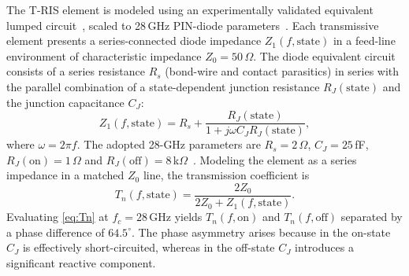 \documentclass[journal]{IEEEtran}
\newcommand{\Tris}{T-RIS}
\begin{document}
The \Tris{} element is modeled using an experimentally validated equivalent
lumped circuit~\cite{demmer2023hybrid}, scaled to 28\,GHz PIN-diode
parameters~\cite{dai2020reconfigurable}. Each transmissive element presents
a series-connected diode impedance $Z_1(f,\mathrm{state})$ in a feed-line
environment of characteristic impedance $Z_0 = 50\,\Omega$. The diode
equivalent circuit consists of a series resistance $R_s$ (bond-wire and
contact parasitics) in series with the parallel combination of a
state-dependent junction resistance $R_J(\mathrm{state})$ and the junction
capacitance $C_J$:
\begin{equation}
Z_1(f,\mathrm{state}) = R_s + \frac{R_J(\mathrm{state})}
{1 + j\omega C_J R_J(\mathrm{state})},
\label{eq:diode_Z}
\end{equation}
where $\omega = 2\pi f$. The adopted 28-GHz parameters are
$R_s = 2\,\Omega$, $C_J = 25$\,fF, $R_J(\mathrm{on}) = 1\,\Omega$ and
$R_J(\mathrm{off}) = 8\,$k$\Omega$~\cite{pozar2011microwave,dai2020reconfigurable}.
Modeling the element as a series impedance in a matched $Z_0$ line, the
transmission coefficient is~\cite{dai2020reconfigurable}
\begin{equation}
T_n(f,\mathrm{state}) = \frac{2Z_0}{2Z_0 + Z_1(f,\mathrm{state})}.
\label{eq:Tn}
\end{equation}
Evaluating \eqref{eq:Tn} at $f_c = 28$\,GHz yields $T_n(f,\mathrm{on})$ and
$T_n(f,\mathrm{off})$ separated by a phase difference of $64.5^\circ$. The
phase asymmetry arises because in the on-state $C_J$ is effectively
short-circuited, whereas in the off-state $C_J$ introduces a significant
reactive component.
\end{document}
